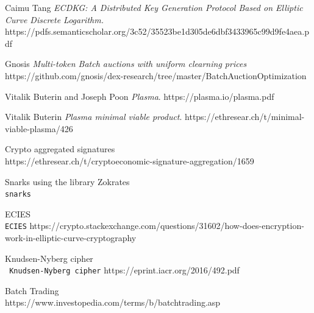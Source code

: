 \documentclass[11pt,parskip=full]{scrartcl}%
\begin{document}
\begin{thebibliography}{9}
Caimu Tang
\textit{ECDKG: A Distributed Key Generation Protocol Based on Elliptic
Curve Discrete Logarithm.}  
https://pdfs.semanticscholar.org/3c52/35523be1d305de6dbf3433965c99d9fe4aea.pdf
 

Gnosis
\textit{Multi-token Batch auctions with uniform clearning prices}  
https://github.com/gnosis/dex-research/tree/master/BatchAuctionOptimization

Vitalik Buterin and Joseph Poon
\textit{Plasma}.
https://plasma.io/plasma.pdf

Vitalik Buterin
\textit{Plasma minimal viable product}.
https://ethresear.ch/t/minimal-viable-plasma/426
 
Crypto aggregated signatures
\\\texttt{}
https://ethresear.ch/t/cryptoeconomic-signature-aggregation/1659

Snarks using the library Zokrates
\\\texttt{snarks}

ECIES
\\\texttt{ECIES}
https://crypto.stackexchange.com/questions/31602/how-does-encryption-work-in-elliptic-curve-cryptography

Knudsen-Nyberg cipher
\\\texttt{ Knudsen-Nyberg cipher}
https://eprint.iacr.org/2016/492.pdf


Batch Trading
\\\texttt{}
https://www.investopedia.com/terms/b/batchtrading.asp

\end{thebibliography}
\end{document}
